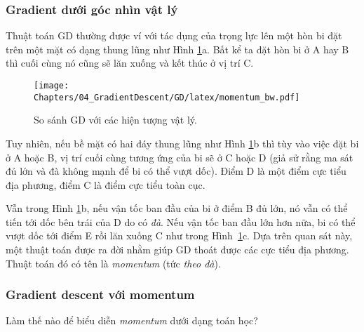 \subsubsection{Gradient dưới góc nhìn vật lý }

Thuật toán GD thường được ví với tác dụng của trọng lực lên một hòn bi đặt trên
một mặt có dạng thung lũng như Hình \ref{fig:8_1}a. Bất kể ta đặt hòn bi ở A
hay B thì cuối cùng nó cũng sẽ lăn xuống và kết thúc ở vị trí C.

\begin{figure}[t]
\centering
\texttt{[image: Chapters/04\_GradientDescent/GD/latex/momentum\_bw.pdf]}
\caption[]{So sánh GD với các hiện tượng vật lý.}
\label{fig:8_1}
\end{figure}
Tuy nhiên, nếu bề mặt có hai đáy thung lũng như Hình \ref{fig:8_1}b thì tùy
vào việc đặt bi ở A hoặc B, vị trí cuối cùng tương ứng của bi sẽ ở C hoặc D (giả
sử rằng ma sát đủ lớn và đà không mạnh để bi có thể vượt dốc). Điểm D
là một điểm cực tiểu địa phương, điểm C là điểm cực tiểu toàn cục.

Vẫn trong Hình \ref{fig:8_1}b, nếu vận tốc ban đầu của bi ở điểm B đủ lớn, nó
vẫn có thể tiến tới dốc bên trái của D do có \textit{đà}. Nếu vận tốc
ban đầu lớn hơn nữa, bi có thể vượt dốc tới điểm E rồi lăn xuống C như trong
Hình~\ref{fig:8_1}c. Dựa trên quan sát này, một thuật toán được ra đời nhằm giúp
GD thoát được các cực tiểu địa phương. Thuật toán đó có tên là \textit{momentum}
(tức \textit{theo đà}).

\subsubsection{Gradient descent với momentum}
Làm thế nào để biểu diễn \textit{momentum} dưới dạng toán học?

